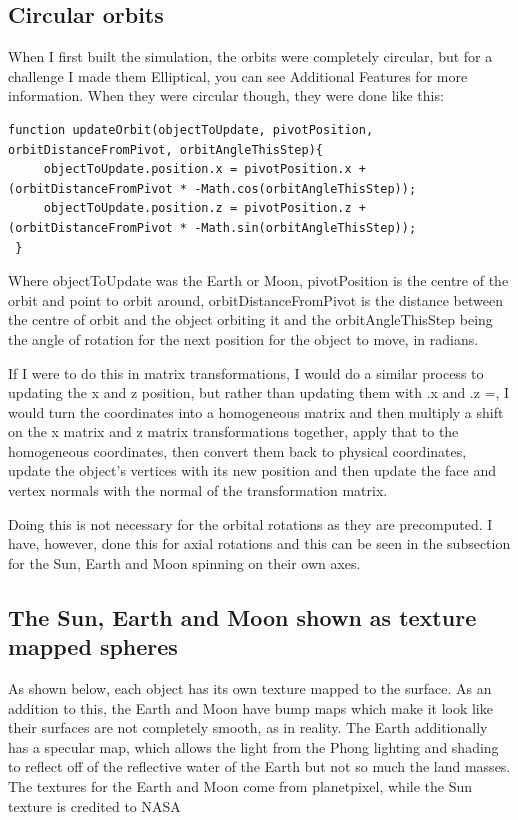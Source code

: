 \documentclass[12pt]{article}
\begin{document}
\subsection{Circular orbits}
When I first built the simulation, the orbits were completely circular, but for a challenge I made them Elliptical, you can see Additional Features for more information. When they were circular though, they were done like this: 

\begin{lstlisting}
function updateOrbit(objectToUpdate, pivotPosition, orbitDistanceFromPivot, orbitAngleThisStep){
     objectToUpdate.position.x = pivotPosition.x + (orbitDistanceFromPivot * -Math.cos(orbitAngleThisStep));
     objectToUpdate.position.z = pivotPosition.z + (orbitDistanceFromPivot * -Math.sin(orbitAngleThisStep));
 }
 \end{lstlisting}
Where objectToUpdate was the Earth or Moon, pivotPosition is the centre of the orbit and point to orbit around, orbitDistanceFromPivot is the distance between the centre of orbit and the object orbiting it and the orbitAngleThisStep being the angle of rotation for the next position for the object to move, in radians.
 
If I were to do this in matrix transformations, I would do a similar process to updating the x and z position, but rather than updating them with .x and .z =, I would turn the coordinates into a homogeneous matrix and then multiply a shift on the x matrix and z matrix transformations together, apply that to the homogeneous coordinates, then convert them back to physical coordinates, update the object's vertices with its new position and then update the face and vertex normals with the normal of the transformation matrix. 
 
Doing this is not necessary for the orbital rotations as they are precomputed. I have, however, done this for axial rotations and this can be seen in the subsection for the Sun, Earth and Moon spinning on their own axes.

\subsection{The Sun, Earth and Moon shown as texture mapped spheres}
As shown below, each object has its own texture mapped to the surface. As an addition to this, the Earth and Moon have bump maps which make it look like their surfaces are not completely smooth, as in reality. The Earth additionally has a specular map, which allows the light from the Phong lighting and shading to reflect off of the reflective water of the Earth but not so much the land masses. The textures for the Earth and Moon come from planetpixel\cite{earthtextures}, while the Sun texture is credited to NASA\cite{suntexture}
\end{document}
